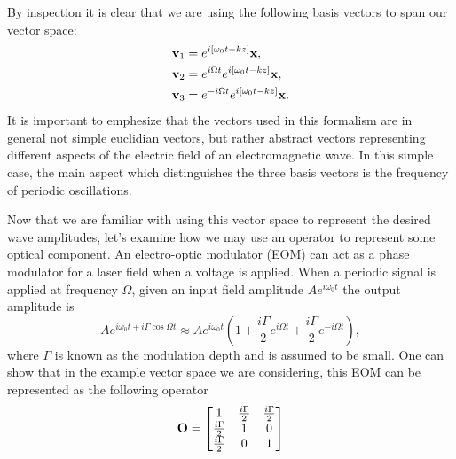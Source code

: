 By inspection it is clear that we are using the following basis vectors to span our vector space:
\begin{align}
\mathbf{v}_1&=e^{i[\omega_0 t-kz]}\mathbf{x}\notag, \\
\mathbf{v}_2&=e^{i\Omega t}e^{i[\omega_0 t-kz]}\mathbf{x}, \\
\mathbf{v}_3&=e^{-i\Omega t}e^{i[\omega_0 t-kz]}\mathbf{x}\notag.
\end{align}
It is important to emphesize that the vectors used in this formalism are in general not simple euclidian vectors, but rather abstract vectors representing different aspects of the electric field of an electromagnetic wave. %
In this simple case, the main aspect which distinguishes the three basis vectors is the frequency of periodic oscillations. %


Now that we are familiar with using this vector space to represent the desired wave amplitudes, let's examine how we may use an operator to represent some optical component. %
An electro-optic modulator (EOM) can act as a phase modulator for a laser field when a voltage is applied. %
When a periodic signal is applied at frequency $\Omega$, given an input field amplitude $Ae^{i\omega_0 t}$ the output amplitude is
\newcommand{\gammahalf}{\frac{i\Gamma}{2}}
\begin{equation}
Ae^{i\omega_0 t + i\Gamma \cos{\Omega t}}\approx Ae^{i\omega_0 t}\left(1+\gammahalf e^{i\Omega t}+\gammahalf e^{-i\Omega t}\right),
\end{equation}
where $\Gamma$ is known as the modulation depth and is assumed to be small. %
One can show that in the example vector space we are considering, this EOM can be represented as the following operator
\begin{equation}
\oper{O} \doteq 
\ms 
1          & \gammahalf & \gammahalf \\
\gammahalf & 1          & 0          \\
\gammahalf & 0          & 1 \\
\me
\end{equation}